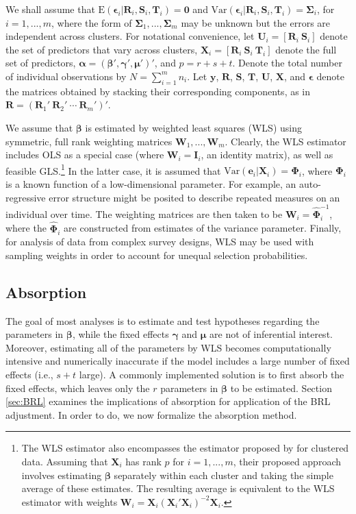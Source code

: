 \documentclass[draft]{ectaart}\usepackage[]{graphicx}\usepackage[]{color}
\newcommand{\E}{\text{E}}
\newcommand{\Var}{\text{Var}}
\newcommand{\bm}{\mathbf}
\newcommand{\bs}{\boldsymbol}
\begin{document}
We shall assume that $\E\left(\bs\epsilon_i\left|\bm{R}_i,\bm{S}_i, \bm{T}_i\right.\right) = \bm{0}$ and $\Var\left(\bs\epsilon_i\left|\bm{R}_i,\bm{S}_i,\bm{T}_i\right.\right) = \bs\Sigma_i$, for $i = 1,...,m$, where the form of $\bs\Sigma_1,...,\bs\Sigma_m$ may be unknown but the errors are independent across clusters. 
For notational convenience, let $\bm{U}_i = \left[\bm{R}_i \ \bm{S}_i \right]$ denote the set of predictors that vary across clusters, $\bm{X}_i = \left[\bm{R}_i \ \bm{S}_i \ \bm{T}_i \right]$ denote the full set of predictors, $\bs\alpha = \left(\bs\beta', \bs\gamma', \bs\mu' \right)'$, and $p = r + s + t$.
Denote the total number of individual observations by $N = \sum_{i=1}^m n_i$.
Let $\bm{y}$, $\bm{R}$, $\bm{S}$, $\bm{T}$, $\bm{U}$, $\bm{X}$, and $\bs\epsilon$ denote the matrices obtained by stacking their corresponding components, as in $\bm{R} = \left(\bm{R}_1' \ \bm{R}_2' \ \cdots \ \bm{R}_m'\right)'$. 

We assume that $\bs\beta$ is estimated by weighted least squares (WLS) using symmetric, full rank weighting matrices $\bm{W}_1,...,\bm{W}_m$. 
Clearly, the WLS estimator includes OLS as a special case (where $\bm{W}_i = \bm{I}_i$, an identity matrix), as well as feasible GLS.\footnote{
The WLS estimator also encompasses the estimator proposed by \citet{Ibragimov2010tstatistic} for clustered data. 
Assuming that $\bm{X}_i$ has rank $p$ for $i = 1,...,m$, their proposed approach involves estimating $\bs\beta$ separately within each cluster and taking the simple average of these estimates. 
The resulting average is equivalent to the WLS estimator with weights $\bm{W}_i = \bm{X}_i \left(\bm{X}_i'\bm{X}_i\right)^{-2} \bm{X}_i$.} 
In the latter case, it is assumed that $\Var\left(\bm{e}_i\left|\bm{X}_i\right.\right) = \bs\Phi_i$, where $\bs\Phi_i$ is a known function of a low-dimensional parameter. 
For example, an auto-regressive error structure might be posited to describe repeated measures on an individual over time. 
The weighting matrices are then taken to be $\bm{W}_i = \hat{\bs\Phi}_i^{-1}$, where the $\hat{\bs\Phi}_i$ are constructed from estimates of the variance parameter.
Finally, for analysis of data from complex survey designs, WLS may be used with sampling weights in order to account for unequal selection probabilities.

\subsection{Absorption}

The goal of most analyses is to estimate and test hypotheses regarding the parameters in $\bs\beta$, while the fixed effects $\bs\gamma$ and $\bs\mu$ are not of inferential interest. Moreover, estimating all of the parameters by WLS becomes computationally intensive and numerically inaccurate if the model includes a large number of fixed effects (i.e., $s + t$ large). 
A commonly implemented solution is to first absorb the fixed effects, which leaves only the $r$ parameters in $\bs\beta$ to be estimated. 
Section \ref{sec:BRL} examines the implications of absorption for application of the BRL adjustment. 
In order to do, we now formalize the absorption method.
\end{document}
